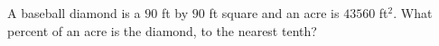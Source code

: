 A baseball diamond is a $90$ ft by $90$ ft square and an acre is $43560$ ft$^2$. What percent of an acre is the diamond, to the nearest tenth?
